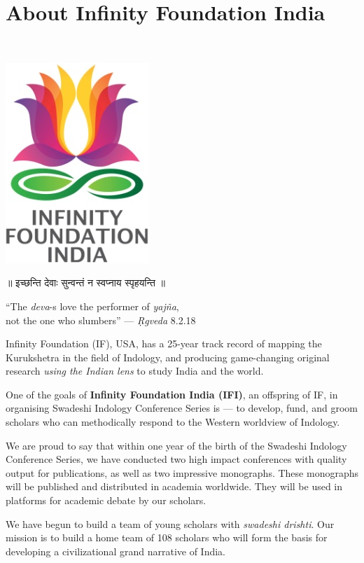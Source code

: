 \thispagestyle{empty}

\chapter*{About Infinity Foundation India}

~
\vskip -30pt

\centerline{\includegraphics[scale=0.25]{figures/logo.png}}\label{about}

\begin{center}
{\dev ॥ इच्छन्ति  देवाः सुन्वन्तं न स्वप्नाय स्पृहयन्ति ॥}

``The {\sl deva}-s love the performer of {\sl yajña},\\ 
not the one who slumbers'' --- \textsl{Ṛgveda} 8.2.18
\end{center} 

Infinity Foundation (IF), USA, has a 25-year track record of mapping the Kurukshetra in the field of Indology, and producing game-changing original research {\sl using the Indian lens} to study India and the world. 

One of the goals of {\bf Infinity Foundation India (IFI)}, an offspring of IF, in organising Swadeshi Indology Conference Series is --- to develop, fund, and groom scholars who can methodically respond to the Western worldview of Indology.

We are proud to say that within one year of the birth of the Swadeshi Indology Conference Series, we have conducted two high impact conferences with quality output for publications, as well as two impressive monographs. These monographs will be published and distributed in academia worldwide. They will be used in platforms for academic debate by our scholars.

We have begun to build a team of young scholars with {\sl swadeshi drishti}. Our mission is to build a home team of 108 scholars who will form the basis for developing a civilizational grand narrative of India.
